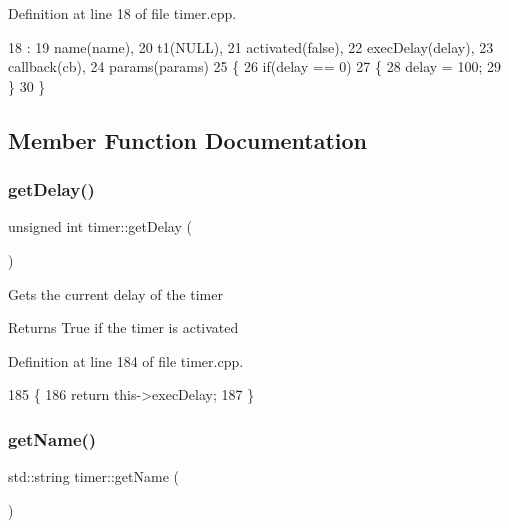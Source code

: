 Definition at line 18 of file timer.\+cpp.


\begin{DoxyCode}
18                                                                                     :
19     name(name),
20     t1(NULL),
21     activated(\textcolor{keyword}{false}),
22     execDelay(delay),
23     callback(cb),
24     params(params)
25 \{
26     \textcolor{keywordflow}{if}(delay == 0)
27     \{
28         delay = 100;
29     \}
30 \}
\end{DoxyCode}


\subsection{Member Function Documentation}
\mbox{\label{classtimer_ab00cba4ccf638a425b9f6db10d2fd16f}} 
\subsubsection{\texorpdfstring{get\+Delay()}{getDelay()}}
{\footnotesize\ttfamily unsigned int timer\+::get\+Delay (\begin{DoxyParamCaption}{ }\end{DoxyParamCaption})}

Gets the current delay of the timer \begin{DoxyReturn}{Returns}
True if the timer is activated 
\end{DoxyReturn}


Definition at line 184 of file timer.\+cpp.


\begin{DoxyCode}
185 \{
186    \textcolor{keywordflow}{return} this->execDelay;
187 \}
\end{DoxyCode}
\mbox{\label{classtimer_a30d5e497b9bee9b2d00c7f511c85e84d}} 
\subsubsection{\texorpdfstring{get\+Name()}{getName()}}
{\footnotesize\ttfamily std\+::string timer\+::get\+Name (\begin{DoxyParamCaption}{ }\end{DoxyParamCaption})}


